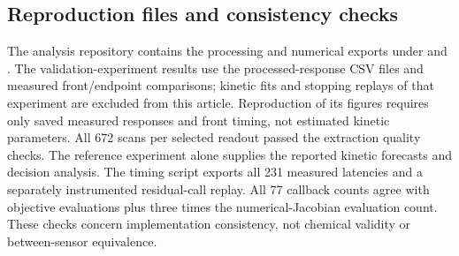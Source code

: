\documentclass[lettersize,journal]{IEEEtran}
\begin{document}
\subsection{Reproduction files and consistency checks}
The analysis repository contains the processing and numerical exports
under  and
. The validation-experiment results use the processed-response CSV files
and measured front/endpoint comparisons; kinetic fits and stopping replays
of that experiment are excluded from this article. Reproduction of its
figures requires only saved measured responses and front timing, not
estimated kinetic parameters. All 672 scans per selected readout passed
the extraction quality checks. The reference experiment alone supplies
the reported kinetic forecasts and decision analysis.
The timing script  exports all 231 measured
latencies and a separately instrumented residual-call replay. All 77
callback counts agree with objective evaluations plus three times the
numerical-Jacobian evaluation count. These checks concern implementation
consistency, not chemical validity or between-sensor equivalence.
\end{document}
